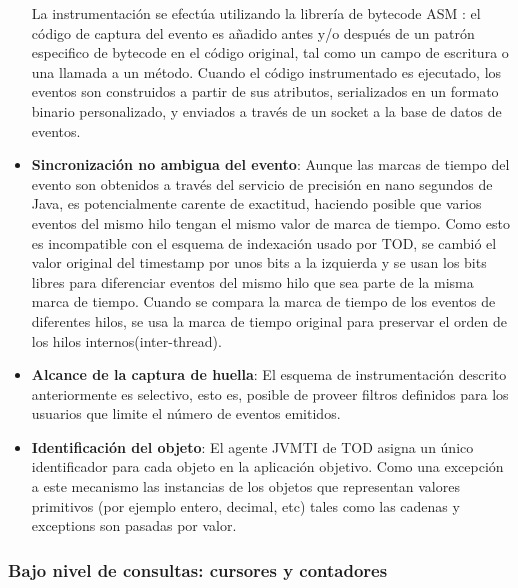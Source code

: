 \documentclass[12pt,legalpaper]{report}
\begin{document}
\begin{itemize}

La instrumentación se efectúa utilizando la librería de bytecode ASM \cite{asm}:  el código de captura del evento es añadido antes y/o después de un patrón especifico de bytecode en el código original, tal como un campo de escritura o una llamada a un método.  Cuando el código instrumentado es ejecutado, los eventos son construidos a partir de sus atributos, serializados en un formato binario personalizado, y enviados a través de un socket a la base de datos de eventos.

	\item \textbf{Sincronización no ambigua del evento}: Aunque las marcas de tiempo del evento son obtenidos a través del servicio de precisión en nano segundos de Java, es potencialmente carente de exactitud, haciendo posible que varios eventos del mismo hilo tengan el mismo valor de marca de tiempo.  Como esto es incompatible con el esquema de indexación usado por TOD, se cambió el valor original del timestamp por unos bits a la izquierda y se usan los bits libres para diferenciar eventos del mismo hilo que sea parte de la misma marca de tiempo.  Cuando se compara la marca de tiempo de los eventos de diferentes hilos, se usa la marca de tiempo original para preservar el orden de los hilos internos(inter-thread).

	\item \textbf{Alcance de la captura de huella}: El esquema de instrumentación descrito anteriormente es selectivo, esto es, posible de proveer filtros definidos para los usuarios que limite el número de eventos emitidos.

	\item \textbf{Identificación del objeto}: El agente JVMTI de TOD asigna un único identificador para cada objeto en la aplicación objetivo.  Como una excepción a este mecanismo las instancias de los objetos que representan valores primitivos (por ejemplo entero, decimal, etc) tales como las cadenas y exceptions son pasadas por valor.
\end{itemize}

			\subsubsection[Bajo nivel de consultas]{Bajo nivel de consultas: cursores y contadores}
\end{document}

